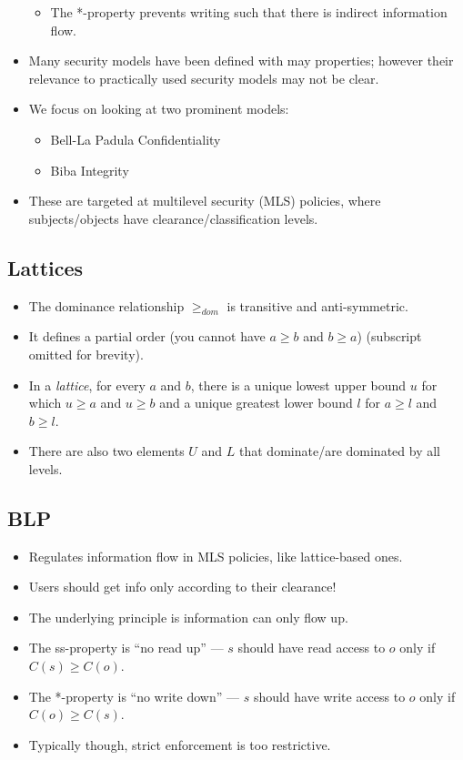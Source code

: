 \documentclass{article}
\begin{document}
\begin{itemize}
        \begin{itemize}
            \item The *-property prevents writing such that there is indirect information flow.
        \end{itemize}
    \item Many security models have been defined with may properties; however their relevance to practically used security models may not be clear.
    \item We focus on looking at two prominent models:
        \begin{itemize}
            \item Bell-La Padula Confidentiality
            \item Biba Integrity
        \end{itemize}
    \item These are targeted at multilevel security (MLS) policies, where subjects/objects have clearance/classification levels.
\end{itemize}

\subsection{Lattices}
\begin{itemize}
    \item The dominance relationship $\geq_{dom}$ is transitive and anti-symmetric.
    \item It defines a partial order (you cannot have $a \geq b$ and $b \geq a$) (subscript omitted for brevity).
    \item In a \emph{lattice}, for every $a$ and $b$, there is a unique lowest upper bound $u$ for which $u \geq a$ and $u \geq b$ and a unique greatest lower bound $l$ for $a \geq l$ and $b \geq l$.
    \item There are also two elements $U$ and $L$ that dominate/are dominated by all levels.
\end{itemize}

\subsection{BLP}
\begin{itemize}
    \item Regulates information flow in MLS policies, like lattice-based ones.
    \item Users should get info only according to their clearance!
    \item The underlying principle is information can only flow up.
    \item The ss-property is ``no read up'' --- $s$ should have read access to $o$ only if $C(s) \geq C(o)$.
    \item The *-property is ``no write down'' --- $s$ should have write access to $o$ only if $C(o) \geq C(s)$.
    \item Typically though, strict enforcement is too restrictive.
\end{itemize}
\end{document}
